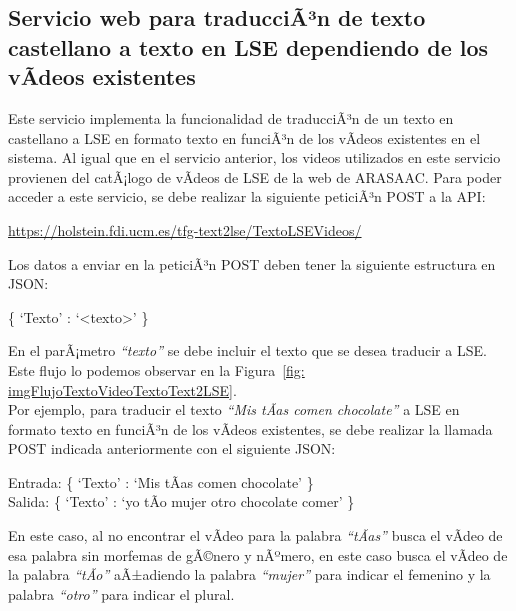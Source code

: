 \subsection{Servicio web para traducciÃ³n de texto castellano a texto en LSE dependiendo de los vÃ­deos existentes}

Este servicio implementa la funcionalidad de traducciÃ³n de un texto en castellano a LSE en formato texto en funciÃ³n de los vÃ­deos existentes en el sistema. Al igual que en el servicio anterior, los videos utilizados en este servicio provienen del catÃ¡logo de vÃ­deos de LSE de la web de ARASAAC. Para poder acceder a este servicio, se debe realizar la siguiente peticiÃ³n POST a la API:\\

\begin{shaded}
	\url{https://holstein.fdi.ucm.es/tfg-text2lse/TextoLSEVideos/  }	
\end{shaded}


Los datos a enviar en la peticiÃ³n POST deben tener la siguiente estructura en JSON: 
\begin{center}
	
	\{ `Texto' : `<texto>' \}
	
\end{center}


En el parÃ¡metro \textit{``texto''} se debe incluir el texto que se desea traducir a LSE. Este flujo lo podemos observar en la Figura~\ref {fig: imgFlujoTextoVideoTextoText2LSE}.\\

Por ejemplo, para traducir el texto \textit{``Mis tÃ­as comen chocolate''} a LSE en formato texto en funciÃ³n de los vÃ­deos existentes, se debe realizar la llamada POST indicada anteriormente con el siguiente JSON:


\begin{center}
	Entrada: \{ `Texto' : `Mis tÃ­as comen chocolate' \} \\
	Salida: \{ `Texto' : `yo tÃ­o mujer otro chocolate comer' \}
\end{center}

En este caso, al no encontrar el vÃ­deo para la palabra \textit{``tÃ­as''} busca el vÃ­deo de esa palabra sin morfemas de gÃ©nero y nÃºmero, en este caso busca el vÃ­deo de la palabra \textit{``tÃ­o''} aÃ±adiendo la palabra  \textit{``mujer''} para indicar el femenino y la palabra  \textit{``otro''} para indicar el plural.


